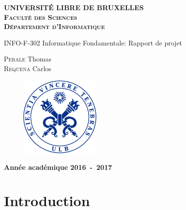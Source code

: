 \documentclass[letterpaper]{article}
\begin{document}
 \begin{titlepage}
 \begin{center}
 \textbf{\textsc{UNIVERSIT\'E LIBRE DE BRUXELLES}}\\
 \textbf{\textsc{Faculté des Sciences}}\\
 \textbf{\textsc{Département d'Informatique}}
 \vfill{}\vfill{}
 \begin{center}{\Huge INFO-F-302 Informatique Fondamentale: Rapport de projet}\end{center}{\Huge \par}
 \begin{center}{\large \textsc{Perale} Thomas\\\textsc{Requena} Carlos}\end{center}{\Huge \par}
 \vfill{}\vfill{}
 \vfill{}\vfill{}\enlargethispage{3cm}

 \begin{figure} [h!]
             \centering
     \includegraphics[width=4cm]{Sigle_ULB.png}
 \end{figure}

 \textbf{Année académique 2016~-~2017}
 \end{center}

 \end{titlepage}

\tableofcontents
\pagebreak

\section{Introduction}
\end{document}
